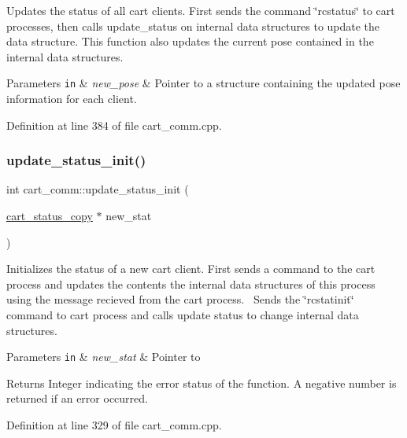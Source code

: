 Updates the status of all cart clients. First sends the command \char`\"{}rcstatus\char`\"{} to cart processes, then calls update\+\_\+status on internal data structures to update the data structure. This function also updates the current pose contained in the internal data structures. 
\begin{DoxyParams}[1]{Parameters}
\mbox{\tt in}  & {\em new\+\_\+pose} & Pointer to a structure containing the updated pose information for each client. \\
\hline
\end{DoxyParams}


Definition at line 384 of file cart\+\_\+comm.\+cpp.

\mbox{\label{classcart__comm_aa4aa3baa5fae85a6469ae9683a6d2cbc}} 
\subsubsection{\texorpdfstring{update\+\_\+status\+\_\+init()}{update\_status\_init()}}
{\footnotesize\ttfamily int cart\+\_\+comm\+::update\+\_\+status\+\_\+init (\begin{DoxyParamCaption}\item[{\mbox{\hyperlink{classcart__status__copy}{cart\+\_\+status\+\_\+copy}} $\ast$}]{new\+\_\+stat }\end{DoxyParamCaption})}

Initializes the status of a new cart client. First sends a command to the cart process and updates the contents the internal data structures of this process using the message recieved from the cart process.~\newline
Sends the \char`\"{}rcstatinit\char`\"{} command to cart process and calls update status to change internal data structures. 
\begin{DoxyParams}[1]{Parameters}
\mbox{\tt in}  & {\em new\+\_\+stat} & Pointer to \\
\hline
\end{DoxyParams}
\begin{DoxyReturn}{Returns}
Integer indicating the error status of the function. A negative number is returned if an error occurred. 
\end{DoxyReturn}


Definition at line 329 of file cart\+\_\+comm.\+cpp.



